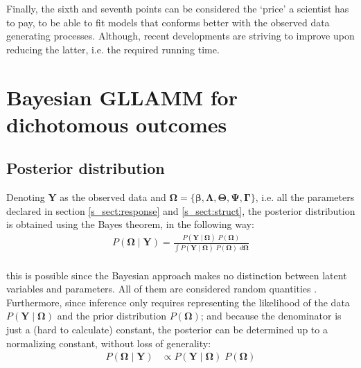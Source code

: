Finally, the sixth and seventh points can be considered the `price' a scientist has to pay, to be able to fit models that conforms better with the observed data generating processes. Although, recent developments are striving to improve upon reducing the latter, i.e. the required running time.


\section{Bayesian GLLAMM for dichotomous outcomes} \label{sect:model}

\subsection{Posterior distribution}

Denoting $\mathbf{Y}$ as the observed data and $\pmb{\Omega} = \{ \pmb{\beta}, \pmb{\Lambda}, \pmb{\Theta}, \pmb{\Psi}, \pmb{\Gamma} \}$, i.e. all the parameters declared in section \ref{s_sect:response} and \ref{s_sect:struct}, the posterior distribution is obtained using the Bayes theorem, in the following way:
%
\begin{equation} \label{eq:posterior1}
	\begin{split}
		P(\pmb{\Omega} \; | \; \mathbf{Y}) = \frac{ P( \mathbf{Y} \; | \; \pmb{\Omega} ) \; P( \pmb{\Omega} ) }{ \int P( \mathbf{Y} \; | \; \pmb{\Omega} ) \; P( \pmb{\Omega} ) \; d\pmb{\Omega} } \\
	\end{split}
\end{equation}

\noindent this is possible since the Bayesian approach makes no distinction between latent variables and parameters. All of them are considered random quantities \cite{Skrondal_et_al_2004a}. Furthermore, since inference only requires representing the likelihood of the data $P( \mathbf{Y} \; | \; \pmb{\Omega} )$ and the prior distribution $P( \pmb{\Omega} )$; and because the denominator is just a (hard to calculate) constant, the posterior can be determined up to a normalizing constant, without loss of generality:
%
\begin{equation} \label{eq:posterior2}
	\begin{split}
		P(\pmb{\Omega} \; | \; \mathbf{Y}) &\propto P( \mathbf{Y} \; | \; \pmb{\Omega} ) \; P( \pmb{\Omega} )
	\end{split}
\end{equation}

